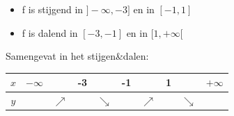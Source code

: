 \documentclass[12pt,twoside]{article}
\begin{document}
\begin{theorie}
\begin{itemize}
\item f is stijgend in $]-\infty,-3]$ en in $[-1,1]$
\item f is dalend in $[-3,-1]$ en in $[1,+\infty[$
\end{itemize}

Samengevat in het stijgen\&dalen:

\begin{center}
  \begin{tabular}{c|lcccccccr}
    $x$ & $-\infty$ & & -3 & & -1 & & 1 & &$+\infty$\\
    \hline
    $y$ & & $\nearrow$ & & $\searrow$ & & $\nearrow$ & & $\searrow$
  \end{tabular}
\end{center}

\end{theorie}
\end{document}

